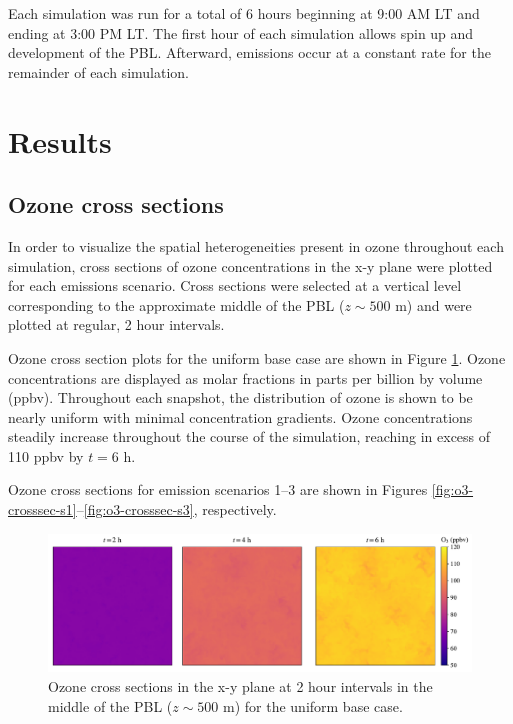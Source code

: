 Each simulation was run for a total of 6 hours beginning at 9:00 AM LT and ending at 3:00 PM LT. The first hour of each simulation allows spin up and development of the PBL. Afterward, emissions occur at a constant rate for the remainder of each simulation.

\section{Results}


\subsection{Ozone cross sections}

In order to visualize the spatial heterogeneities present in ozone throughout each simulation, cross sections of ozone concentrations in the x-y plane were plotted for each emissions scenario. Cross sections were selected at a vertical level corresponding to the approximate middle of the PBL ($z\sim500$ \si{m}) and were plotted at regular, 2 hour intervals. 

Ozone cross section plots for the uniform base case are shown in Figure \ref{fig:o3-crosssec-ub}. Ozone concentrations are displayed as molar fractions in parts per billion by volume (ppbv). Throughout each snapshot, the distribution of ozone is shown to be nearly uniform with minimal concentration gradients. Ozone concentrations steadily increase throughout the course of the simulation, reaching in excess of 110 ppbv by $t=6$ h.

Ozone cross sections for emission scenarios 1--3 are shown in Figures \ref{fig:o3-crosssec-s1}--\ref{fig:o3-crosssec-s3}, respectively.

\begin{figure}[h]
    \centering
    \includegraphics[width=\textwidth]{figures/chapter4/o3-crosssec-uniform-basecase-z25.pdf}
    \caption{Ozone cross sections in the x-y plane at 2 hour intervals in the middle of the PBL ($z\sim500$ \si{m}) for the uniform base case.}
    \label{fig:o3-crosssec-ub}
  \end{figure}

